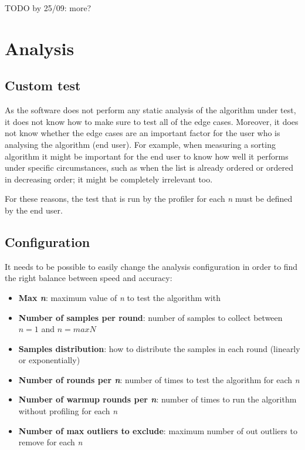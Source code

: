 \noindent TODO by 25/09: more?

\section{Analysis}
\label{sec:requirementanalysis:analysis}

\subsection{Custom test}
As the software does not perform any static analysis of the algorithm under test, it does not know how to make sure to test all of the edge cases. Moreover, it does not know whether the edge cases are an important factor for the user who is analysing the algorithm (end user). For example, when measuring a sorting algorithm it might be important for the end user to know how well it performs under specific circumstances, such as when the list is already ordered or ordered in decreasing order; it might be completely irrelevant too.

\noindent For these reasons, the test that is run by the profiler for each \emph{n} must be defined by the end user.

\subsection{Configuration}
It needs to be possible to easily change the analysis configuration in order to find the right balance between speed and accuracy:
\begin{itemize}
  \item \textbf{Max \emph{n}}: maximum value of \emph{n} to test the algorithm with
  \item \textbf{Number of samples per round}: number of samples to collect between $n = 1$ and $n = maxN$
  \item \textbf{Samples distribution}: how to distribute the samples in each round (linearly or exponentially)
  \item \textbf{Number of rounds per \emph{n}}: number of times to test the algorithm for each \emph{n}
  \item \textbf{Number of warmup rounds per \emph{n}}: number of times to run the algorithm without profiling for each \emph{n}
  \item \textbf{Number of max outliers to exclude}: maximum number of out outliers to remove for each \emph{n}
\end{itemize}

